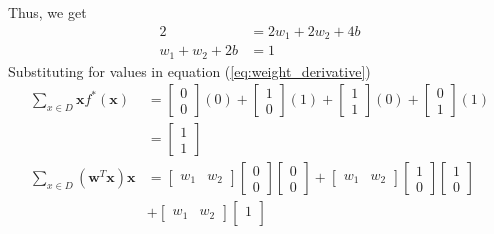 Thus, we get
\begin{align}
\nonumber 2 &= 2w_1 + 2w_2 + 4b \\
w_1 + w_2 + 2b &= 1
\label{eq:first_set_normal_eq}
\end{align}
Substituting for values in equation (\ref{eq:weight_derivative})
\begin{align}
  \sum_{x\in D}\textbf{x}f^{*}(\textbf{x}) &= \begin{bmatrix}
    0 \\
    0
  \end{bmatrix}(0) + \begin{bmatrix}
    1 \\
    0
  \end{bmatrix}(1) + \begin{bmatrix}
    1 \\
    1
  \end{bmatrix}(0)+ \begin{bmatrix}
    0 \\
    1
  \end{bmatrix}(1) \nonumber \\
  &= \begin{bmatrix}
    1 \\
    1
  \end{bmatrix}\\
  \nonumber
  \sum_{x\in D}(\textbf{w}^T\textbf{x})\textbf{x} &= \begin{bmatrix}
    w_1 & w_2
  \end{bmatrix} \begin{bmatrix}
    0 \\
    0
  \end{bmatrix} \begin{bmatrix}
    0 \\
    0
  \end{bmatrix} + \begin{bmatrix}
    w_1 & w_2
  \end{bmatrix} \begin{bmatrix}
    1 \\
    0
  \end{bmatrix} \begin{bmatrix}
    1 \\
    0
  \end{bmatrix} \\ \nonumber
  &+ \begin{bmatrix}
    w_1 & w_2
  \end{bmatrix} \begin{bmatrix}
    1 \\

\end{bmatrix}
\end{align}
